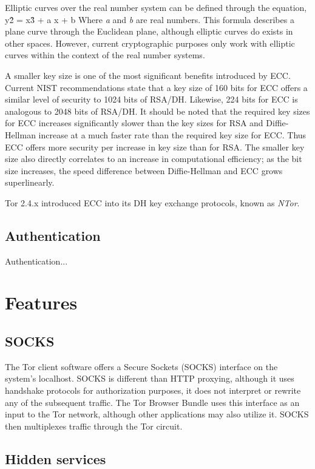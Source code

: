 \documentclass[journal]{IEEEtran}
\begin{document}
Elliptic curves over the real number system can be defined through the equation,
y\^2\; =\; x\^3\; +\; a x\; +\; b\;
Where \textit{a} and \textit{b} are real numbers. This formula describes a plane curve through the Euclidean plane, although elliptic curves do exists in other spaces. However, current cryptographic purposes only work with elliptic curves within the context of the real number systems.

A smaller key size is one of the most significant benefits introduced by ECC. Current NIST recommendations state that a key size of 160 bits for ECC offers a similar level of security to 1024 bits of RSA/DH. Likewise, 224 bits for ECC is analogous to 2048 bits of RSA/DH. It should be noted that the required key sizes for ECC increases significantly slower than the key sizes for RSA and Diffie-Hellman increase at a much faster rate than the required key size for ECC. Thus ECC offers more security per increase in key size than for RSA. The smaller key size also directly correlates to an increase in computational efficiency; as the bit size increases, the speed difference between Diffie-Hellman and ECC grows superlinearly.\cite{CaseForECC}

Tor 2.4.x introduced ECC into its DH key exchange protocols, known as \textit{NTor}.

\subsection{Authentication}

Authentication...

\section{Features}

\subsection{SOCKS}

The Tor client software offers a Secure Sockets (SOCKS) interface on the system's localhost. SOCKS is different than HTTP proxying, although it uses handshake protocols for authorization purposes, it does not interpret or rewrite any of the subsequent traffic. The Tor Browser Bundle uses this interface as an input to the Tor network, although other applications may also utilize it. SOCKS then multiplexes traffic through the Tor circuit.

\subsection{Hidden services}
\end{document}
